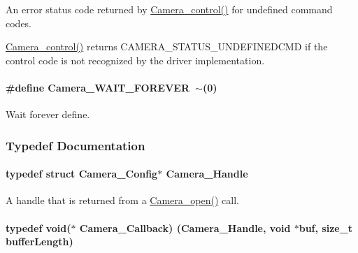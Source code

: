 An error status code returned by \hyperlink{_camera_8h_adfc7e9a60daa499220296a238a09b393}{Camera\+\_\+control()} for undefined command codes. 

\hyperlink{_camera_8h_adfc7e9a60daa499220296a238a09b393}{Camera\+\_\+control()} returns C\+A\+M\+E\+R\+A\+\_\+\+S\+T\+A\+T\+U\+S\+\_\+\+U\+N\+D\+E\+F\+I\+N\+E\+D\+C\+M\+D if the control code is not recognized by the driver implementation. 
\paragraph[{Camera\+\_\+\+W\+A\+I\+T\+\_\+\+F\+O\+R\+E\+V\+E\+R}]{\setlength{\rightskip}{0pt plus 5cm}\#define Camera\+\_\+\+W\+A\+I\+T\+\_\+\+F\+O\+R\+E\+V\+E\+R~$\sim$(0)}\label{_camera_8h_a1b85e579e68cecb09d1e2be70a6c56a9}


Wait forever define. 



\subsubsection{Typedef Documentation}
\paragraph[{Camera\+\_\+\+Handle}]{\setlength{\rightskip}{0pt plus 5cm}typedef struct {\bf Camera\+\_\+\+Config}$\ast$ {\bf Camera\+\_\+\+Handle}}\label{_camera_8h_a68ce39c29bb7acaf6a7180bb6d6a7d06}


A handle that is returned from a \hyperlink{_camera_8h_a5bd1f515c97e0f598ff554c663bc6cde}{Camera\+\_\+open()} call. 

\paragraph[{Camera\+\_\+\+Callback}]{\setlength{\rightskip}{0pt plus 5cm}typedef void($\ast$ Camera\+\_\+\+Callback) ({\bf Camera\+\_\+\+Handle}, void $\ast$buf, size\+\_\+t buffer\+Length)}\label{_camera_8h_ad70b3ced1706386d1a093a0bf659bd87}


